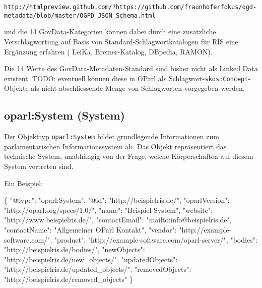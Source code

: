 \documentclass[,a4paper]{article}
\newenvironment{Shaded}{}{}
\newcommand{\DataTypeTok}[1]{\textcolor[rgb]{0.56,0.13,0.00}{{#1}}}
\newcommand{\StringTok}[1]{\textcolor[rgb]{0.25,0.44,0.63}{{#1}}}
\newcommand{\NormalTok}[1]{{#1}}
\begin{document}
\begin{verbatim}
http://htmlpreview.github.com/?https://github.com/fraunhoferfokus/ogd-metadata/blob/master/OGPD_JSON_Schema.html
\end{verbatim}

und die 14 GovData-Kategorien können dabei durch eine zusätzliche
Verschlagwortung auf Basis von Standard-Schlagwortkatalogen für RIS eine
Ergänzung erfahren ( LeiKa, Bremer-Katalog, DBpedia, RAMON).

Die 14 Werte des GovData-Metadaten-Standard sind bisher nicht als Linked
Data existent. TODO: eventuell können diese in OParl als
Schlagwort-\texttt{skos:Concept}-Objekte als nicht abschliessende Menge
von Schlagworten vorgegeben werden.

\subsection{oparl:System (System)}\label{oparlux5fsystem}

Der Objekttyp \texttt{oparl:System} bildet grundlegende Informationen
zum parlamentarischen Informationssystem ab. Das Objekt repräsentiert
das technische System, unabhängig von der Frage, welche Körperschaften
auf diesem System vertreten sind.

Ein Beispiel:

\begin{Shaded}
\begin{Highlighting}[]
\NormalTok{\{}
    \DataTypeTok{"@type"}\NormalTok{: }\StringTok{"oparl:System"}\NormalTok{,}
    \DataTypeTok{"@id"}\NormalTok{: }\StringTok{"http://beispielris.de/"}\NormalTok{,}
    \DataTypeTok{"oparlVersion"}\NormalTok{: }\StringTok{"http://oparl.org/specs/1.0/"}\NormalTok{,}
    \DataTypeTok{"name"}\NormalTok{: }\StringTok{"Beispiel-System"}\NormalTok{,}
    \DataTypeTok{"website"}\NormalTok{: }\StringTok{"http://www.beispielris.de/"}\NormalTok{,}
    \DataTypeTok{"contactEmail"}\NormalTok{: }\StringTok{"mailto:info@beispielris.de"}\NormalTok{,}
    \DataTypeTok{"contactName"}\NormalTok{: }\StringTok{"Allgemeiner OParl Kontakt"}\NormalTok{,}
    \DataTypeTok{"vendor"}\NormalTok{: }\StringTok{"http://example-software.com/"}\NormalTok{,}
    \DataTypeTok{"product"}\NormalTok{: }\StringTok{"http://example-software.com/oparl-server/"}\NormalTok{,}
    \DataTypeTok{"bodies"}\NormalTok{: }\StringTok{"http://beispielris.de/bodies/"}\NormalTok{,}
    \DataTypeTok{"newObjects"}\NormalTok{: }\StringTok{"http://beispielris.de/new_objects/"}\NormalTok{,}
    \DataTypeTok{"updatedObjects"}\NormalTok{: }\StringTok{"http://beispielris.de/updated_objects/"}\NormalTok{,}
    \DataTypeTok{"removedObjects"}\NormalTok{: }\StringTok{"http://beispielris.de/removed_objects"}
\NormalTok{\}}
\end{Highlighting}
\end{Shaded}
\end{document}
